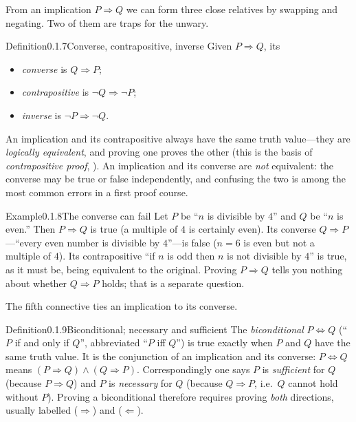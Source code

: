 \documentclass[main.tex]{subfiles}
\begin{document}
\noindent From an implication $P\Rightarrow Q$ we can form three close relatives by swapping and
negating. Two of them are traps for the unwary.

\begin{Obj}{Definition}{0.1.7}{Converse, contrapositive, inverse}
Given $P\Rightarrow Q$, its
\begin{itemize}
  \item \emph{converse} is $Q\Rightarrow P$;
  \item \emph{contrapositive} is $\neg Q\Rightarrow\neg P$;
  \item \emph{inverse} is $\neg P\Rightarrow\neg Q$.
\end{itemize}
An implication and its contrapositive always have the same truth value---they are \emph{logically
equivalent}, and proving one proves the other (this is the basis of \emph{contrapositive proof},
). An implication and its converse are \emph{not} equivalent: the converse may be true or
false independently, and confusing the two is among the most common errors in a first proof course.
\end{Obj}

\begin{ObjL}{Example}{0.1.8}{The converse can fail}
Let $P$ be ``$n$ is divisible by $4$'' and $Q$ be ``$n$ is even.'' Then $P\Rightarrow Q$ is true
(a multiple of $4$ is certainly even). Its converse $Q\Rightarrow P$---``every even number is
divisible by $4$''---is false ($n=6$ is even but not a multiple of $4$). Its contrapositive
``if $n$ is odd then $n$ is not divisible by $4$'' is true, as it must be, being equivalent to the
original. Proving $P\Rightarrow Q$ tells you nothing about whether $Q\Rightarrow P$ holds; that is a
separate question.
\end{ObjL}

\noindent The fifth connective ties an implication to its converse.

\begin{Obj}{Definition}{0.1.9}{Biconditional; necessary and sufficient}
The \emph{biconditional} $P\Leftrightarrow Q$ (``$P$ if and only if $Q$'', abbreviated ``$P$ iff
$Q$'') is true exactly when $P$ and $Q$ have the same truth value. It is the conjunction of an
implication and its converse: $P\Leftrightarrow Q$ means $(P\Rightarrow Q)\wedge(Q\Rightarrow P)$.
Correspondingly one says $P$ is \emph{sufficient} for $Q$ (because $P\Rightarrow Q$) and $P$ is
\emph{necessary} for $Q$ (because $Q\Rightarrow P$, i.e.\ $Q$ cannot hold without $P$). Proving a
biconditional therefore requires proving \emph{both} directions, usually labelled ($\Rightarrow$) and
($\Leftarrow$).
\end{Obj}
\end{document}
